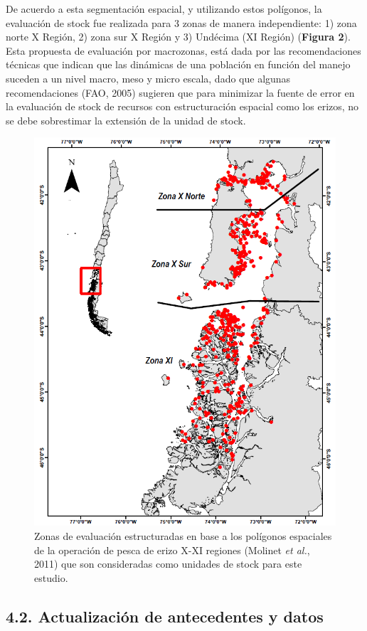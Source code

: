 \documentclass[
]{article}
\begin{document}
De acuerdo a esta segmentación espacial, y utilizando estos polígonos,
la evaluación de stock fue realizada para 3 zonas de manera
independiente: 1) zona norte X Región, 2) zona sur X Región y 3)
Undécima (XI Región) (\textbf{Figura 2}). Esta propuesta de evaluación
por macrozonas, está dada por las recomendaciones técnicas que indican
que las dinámicas de una población en función del manejo suceden a un
nivel macro, meso y micro escala, dado que algunas recomendaciones (FAO,
2005) sugieren que para minimizar la fuente de error en la evaluación de
stock de recursos con estructuración espacial como los erizos, no se
debe sobrestimar la extensión de la unidad de stock.

\begin{figure}
\centering
\includegraphics[width=12cm,height=\textheight]{Figuras/Area_estudio.png}
\caption{Zonas de evaluación estructuradas en base a los polígonos
espaciales de la operación de pesca de erizo X-XI regiones (Molinet
\emph{et al.}, 2011) que son consideradas como unidades de stock para
este estudio.}
\end{figure}

\hypertarget{actualizaciuxf3n-de-antecedentes-y-datos}{%
\subsection{4.2. Actualización de antecedentes y
datos}\label{actualizaciuxf3n-de-antecedentes-y-datos}}
\end{document}
